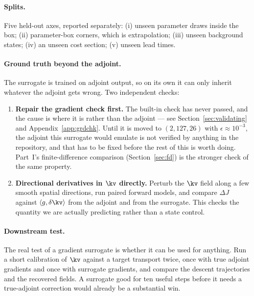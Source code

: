 \paragraph{Splits.} Five held-out axes, reported separately: (i) unseen
parameter draws inside the box; (ii) parameter-box corners, which is
extrapolation; (iii) unseen background states; (iv) an unseen cost section;
(v) unseen lead times.

\paragraph{Ground truth beyond the adjoint.}
The surrogate is trained on adjoint output, so on its own it can only inherit
whatever the adjoint gets wrong. Two independent checks:

\begin{enumerate}
  \item \textbf{Repair the gradient check first.} The built-in check has never
        passed, and the cause is where it is rather than the adjoint --- see
        Section~\ref{sec:validating} and Appendix~\ref{app:grdchk}. Until it is
        moved to $(2,127,26)$ with $\epsilon\approx10^{-3}$, the adjoint this
        surrogate would emulate is not verified by anything in the repository,
        and that has to be fixed before the rest of this is worth doing. Part~I's
        finite-difference comparison (Section~\ref{sec:fd}) is the stronger
        check of the same property.
  \item \textbf{Directional derivatives in $\kv$ directly.} Perturb the $\kv$
        field along a few smooth spatial directions, run paired forward models,
        and compare $\Delta J$ against $\langle g,\delta\kv\rangle$ from the
        adjoint and from the surrogate. This checks the quantity we are
        actually predicting rather than a state control.
\end{enumerate}

\paragraph{Downstream test.} The real test of a gradient surrogate is whether
it can be used for anything. Run a short calibration of $\kv$ against a target
transport twice, once with true adjoint gradients and once with surrogate
gradients, and compare the descent trajectories and the recovered fields. A
surrogate good for ten useful steps before it needs a true-adjoint correction
would already be a substantial win.

